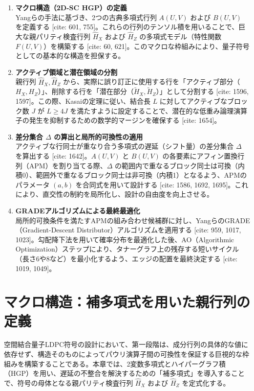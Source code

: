 \documentclass[12pt]{article}
\begin{document}
\begin{enumerate}
    \item \textbf{マクロ構造（2D-SC HGP）の定義} \\
    Yangらの手法に基づき、2つの古典多項式行列 $A(U,V)$ および $B(U,V)$ を定義する [cite: 601, 755]。これらの行列のテンソル積を用いることで、巨大な親パリティ検査行列 $\hat{H}_X$ および $\hat{H}_Z$ の多項式モデル（特性関数 $F(U,V)$）を構築する [cite: 60, 621]。このマクロな枠組みにより、量子符号としての基本的な構造を担保する。

    \item \textbf{アクティブ領域と潜在領域の分割} \\
    親行列 $\hat{H}_X, \hat{H}_Z$ から、実際に誤り訂正に使用する行を「アクティブ部分（$H_X, H_Z$）」、削除する行を「潜在部分（$\tilde{H}_X, \tilde{H}_Z$）」として分割する [cite: 1596, 1597]。この際、Kasaiの定理に従い、結合長 $L$ に対してアクティブなブロック数 $J$ が $L \ge 4J$ を満たすように設定することで、潜在的な低重み論理演算子の発生を抑制するための数学的マージンを確保する [cite: 1654]。

    \item \textbf{差分集合 $\Delta$ の算出と局所的可換性の適用} \\
    アクティブな行同士が重なり合う多項式の遅延（シフト量）の差分集合 $\Delta$ を算出する [cite: 1642]。$A(U,V)$ と $B(U,V)$ の各要素にアフィン置換行列（APM）を割り当てる際、$\Delta$ の範囲内で重なるブロック同士は可換（内積0）、範囲外で重なるブロック同士は非可換（内積1）となるよう、APMのパラメータ $(a, b)$ を合同式を用いて設計する [cite: 1586, 1692, 1695]。これにより、直交性の制約を局所化し、設計の自由度を向上させる。

    \item \textbf{GRADEアルゴリズムによる最終最適化} \\
    局所的可換条件を満たすAPMの組み合わせ候補群に対し、YangらのGRADE（Gradient-Descent Distributor）アルゴリズムを適用する [cite: 959, 1017, 1023]。勾配降下法を用いて確率分布を最適化した後、AO（Algorithmic Optimization）ステップにより、タナーグラフ上の残存する短いサイクル（長さ6や8など）を最小化するよう、エッジの配置を最終決定する [cite: 1019, 1049]。
\end{enumerate}

\section{マクロ構造：補多項式を用いた親行列の定義}

空間結合量子LDPC符号の設計において、第一段階は、成分行列の具体的な値に依存せず、構造そのものによってパウリ演算子間の可換性を保証する巨視的な枠組みを構築することである。本章では、2変数多項式とハイパーグラフ積（HGP）を用い、遅延の不整合を解決するための「補多項式」を導入することで、符号の母体となる親パリティ検査行列 $\hat{H}_X$ および $\hat{H}_Z$ を定式化する。
\end{document}
